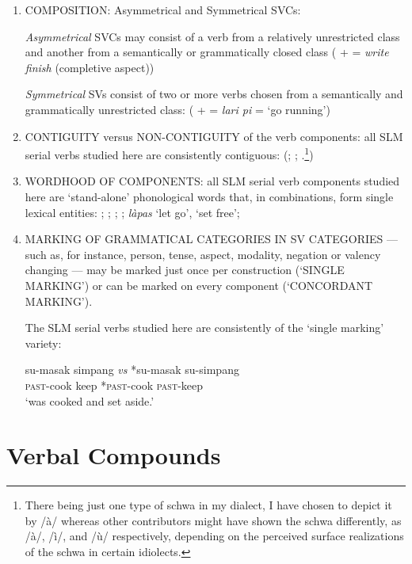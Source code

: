 \begin{enumerate}
\item COMPOSITION: Asymmetrical and Symmetrical SVCs:

 \textit{Asymmetrical} SVCs may consist of a verb from a relatively unrestricted class and another from a semantically or grammatically closed class (
  +  = \textit{write} \textit{finish} (completive aspect))

 \textit{Symmetrical} SVs consist of two or more verbs chosen from a semantically and grammatically unrestricted class: ( +  = \textit{lari pi} = `go running')

\item CONTIGUITY versus NON-CONTIGUITY of the verb components: all SLM serial verbs studied here are consistently contiguous: (; ; .\footnote{There
 being just one type of schwa in my dialect, I have chosen to depict it by /à/ whereas other contributors might have shown the schwa differently, as /à/, /ì/, and /ù/ respectively, depending on the perceived surface realizations of the schwa in certain idiolects.
 }) 

\item WORDHOOD OF COMPONENTS: all SLM serial verb components studied here are `stand-alone' phonological words that, in combinations, form single lexical entities: ; ; ; ; \textit{làpas} `let go', `set free'; 

\item MARKING OF GRAMMATICAL CATEGORIES IN SV CATEGORIES --- such as, for instance, person, tense, aspect, modality, negation or valency changing --- may be marked just once per construction (`SINGLE MARKING') or can be marked on every component (`CONCORDANT MARKING'). 

 The SLM serial verbs studied here are consistently of the `single marking' variety:

\ea
\gll  su-masak simpang {\em vs} *su-masak su-simpang \\
 \textsc{past}-cook keep { } *\textsc{past}-cook \textsc{past}-keep\\
 `was cooked and set aside.'
\z

\end{enumerate}
\section{Verbal Compounds}%

